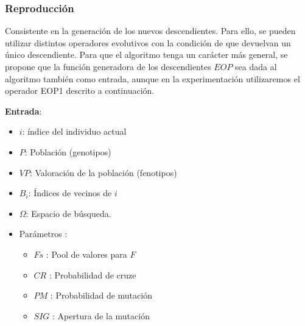 \subsubsection{Reproducción}

Consistente en la generación de los nuevos descendientes. Para ello, se pueden utilizar distintos operadores evolutivos con la condición de que devuelvan un único descendiente. Para que el algoritmo tenga un carácter más general, se propone que la función generadora de los descendientes $EOP$ sea dada al algoritmo también como entrada, aunque en la experimentación utilizaremos el operador EOP1 descrito a continuación.\\

    \noindent\begin{minipage}{\textwidth}
    
        \begin{algorithm}[H]
    \SetAlgoLined
     \vspace{0.2cm}\textbf{Entrada}:
    \begin{multicols}{2}
     \begin{itemize}
         \vspace{0.15cm}\item $i$: índice del individuo actual 
         \vspace{0.15cm}\item $P$: Población (genotipos)
         \vspace{0.15cm}\item $VP$: Valoración de la población (fenotipos)
         \vspace{0.15cm}\item $B_i$: Índices de vecinos de $i$
         \vspace{0.15cm}\item $\Omega$: Espacio de búsqueda.
         \vspace{0.15cm}\item Parámetros : 
            \begin{itemize}
                \item $Fs$ : Pool de valores para $F$ 
                \item $CR$ : Probabilidad de cruze 
                \item $PM$ : Probabilidad de mutación
                \item $SIG$ : Apertura de la mutación 
            \end{itemize} 
     \end{itemize}
    \end{multicols}
    

\end{algorithm}
\end{minipage}
